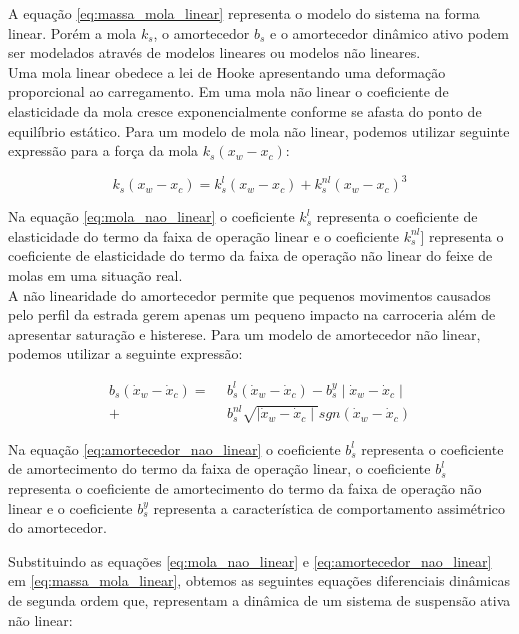 A equação \eqref{eq:massa_mola_linear} representa o modelo do sistema na forma linear. Porém a mola $k_s$, o amortecedor $b_s$ e o amortecedor dinâmico ativo podem ser modelados através de modelos lineares ou modelos não lineares. \\
Uma mola linear obedece a lei de Hooke apresentando uma deformação proporcional ao carregamento. Em uma mola não linear o coeficiente de elasticidade da mola cresce exponencialmente conforme se afasta do ponto de equilíbrio estático.
Para um modelo de mola não linear, podemos utilizar seguinte expressão para a força da mola $ k_{s}(x_{w}-x_{c})$:
  
\begin{equation} \label{eq:mola_nao_linear}
  k_{s}(x_{w}-x_{c}) = k^{l}_{s}(x_{w}-x_{c})+k^{nl}_{s}(x_{w}-x_{c})^{3}
\end{equation}
    
Na equação \eqref{eq:mola_nao_linear} o coeficiente $k^{l}_{s}$ representa o coeficiente de elasticidade do termo da faixa de operação linear e o coeficiente $k^{nl}_{s}$] representa o coeficiente de elasticidade do termo da faixa de operação não linear do feixe de molas em uma situação real.\\
A não linearidade do amortecedor permite que pequenos movimentos causados pelo perfil da estrada gerem apenas um pequeno impacto na carroceria além de apresentar saturação e histerese. Para um modelo de amortecedor não linear, podemos utilizar a seguinte expressão:
 
\begin{equation} \label{eq:amortecedor_nao_linear}
  \begin{aligned}
    b_{s}(\dot{x}_{w}-\dot{x}_{c}) =\ \ &b^{l}_{s}(\dot{x}_{w}-\dot{x}_{c}) - b^{y}_{s}\mid\dot{x}_{w}-\dot{x}_{c}\mid \\
    + &b^{nl}_{s}\sqrt{\mid\dot{x}_{w}-\dot{x}_{c}\mid}sgn(\dot{x}_{w}-\dot{x}_{c}) 
  \end{aligned}
\end{equation}
  
Na equação \eqref{eq:amortecedor_nao_linear} o coeficiente $b^{l}_{s}$ representa o coeficiente de amortecimento do termo da faixa de operação linear, o coeficiente $b^{l}_{s}$ representa o coeficiente de amortecimento do termo da faixa de operação não linear e o coeficiente $b^{y}_{s}$ representa a característica de comportamento assimétrico do amortecedor.
  
Substituindo as equações \eqref{eq:mola_nao_linear} e \eqref{eq:amortecedor_nao_linear} em \eqref{eq:massa_mola_linear}, obtemos as seguintes equações diferenciais dinâmicas de segunda ordem que, representam a dinâmica de um sistema de suspensão ativa não linear:
  
